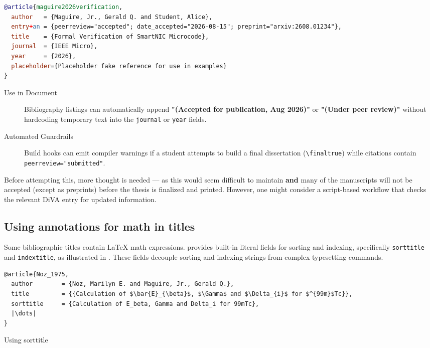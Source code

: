 \documentclass[12pt, twoside]{article}
\begin{document}
\begin{enumerate}
\begin{lstlisting}[language={BibTeX}, breaklines=true, basicstyle=\small\ttfamily,  escapechar=|, caption={{Storing Peer-Review Status \& Acceptance Tracking}}, label=lst:biberPeerReviewMetadata]
@article{maguire2026verification,
  author   = {Maguire, Jr., Gerald Q. and Student, Alice},
  entry+an = {peerreview="accepted"; date_accepted="2026-08-15"; preprint="arxiv:2608.01234"},
  title    = {Formal Verification of SmartNIC Microcode},
  journal  = {IEEE Micro},
  year     = {2026},
  placeholder={Placeholder fake reference for use in examples}
}
\end{lstlisting}

\begin{description}
    \item[Use in Document] Bibliography listings can automatically append \textbf{"(Accepted for publication, Aug 2026)"} or \textbf{"(Under peer review)"} without hardcoding temporary text into the \texttt{journal} or \texttt{year} fields.
    
    \item[Automated Guardrails] Build hooks can emit compiler warnings if a student attempts to build a final dissertation (\texttt{\textbackslash finaltrue}) while citations contain \texttt{peerreview="submitted"}.
\end{description}

Before attempting this, more thought is needed --- as this would seem difficult to maintain \textbf{and} many of the manuscripts will not be accepted (except as preprints) before the thesis is finalized and printed. However, one might consider a script-based workflow that checks the relevant \gls{DiVA} entry for updated information.
\end{enumerate}

\subsection{Using annotations for math in titles}
\label{sec:annotationForMathInTitles}

Some bibliographic titles contain \LaTeX{} math expressions. \BibLaTeX{} provides built-in literal fields for sorting and indexing, specifically \texttt{sorttitle} and \texttt{indextitle}, as illustrated in . These fields decouple sorting and indexing strings from complex typesetting commands.

\begin{listing}[!ht]
\begin{verbatim}
@article{Noz_1975,
  author        = {Noz, Marilyn E. and Maguire, Jr., Gerald Q.},
  title         = {{Calculation of $\bar{E}_{\beta}$, $\Gamma$ and $\Delta_{i}$ for $^{99m}$Tc}},
  sorttitle     = {Calculation of E_beta, Gamma and Delta_i for 99mTc},
  |\dots|
}
\end{verbatim}
\caption{Using sorttitle}
\label{lst:biberSorttitle}
\end{listing}
\FloatBarrier
\end{document}
